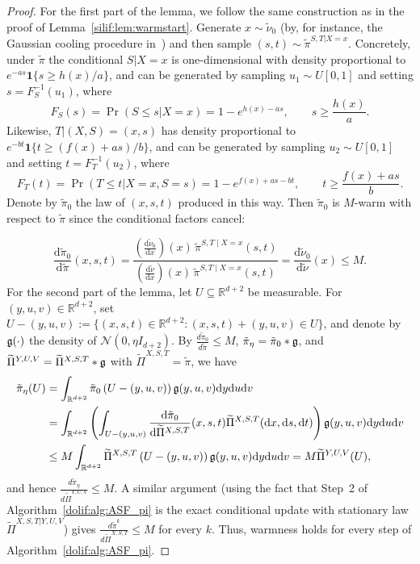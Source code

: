 \documentclass[11pt,letterpaper]{article}
\newcommand{\R}{\mathbb{R}}
\newcommand{\D}{\mathrm{d}}
\newcommand{\brac}[1]{\left( #1\right)}
\begin{document}
\begin{proof}  
For the first part of the lemma, we follow the same construction as in the proof of Lemma~\ref{silif:lem:warmstart}.
Generate $x\sim \tilde{\nu}_0$ (by, for instance, the Gaussian cooling procedure in~\cite[Section 3]{kook2025algodiffusion}) and then sample $(s,t)\sim \tilde{\pi}^{S,T |  X=x}$.
Concretely, under $\tilde{\pi}$ the conditional $S |  X=x$ is one-dimensional with density proportional to $e^{-as}\mathbf{1}\{s\ge h(x)/a\}$, and can be generated by sampling $u_1\sim U[0,1]$ and setting $s=F_S^{-1}(u_1)$, where
\[
F_S(s)=\Pr(S\le s |  X=x)=1-e^{h(x)-as},\qquad s\ge \frac{h(x)}{a}.
\]
Likewise, $T |  (X,S)=(x,s)$ has density proportional to $e^{-bt}\mathbf{1}\{t\ge (f(x)+as)/b\}$, and can be generated by sampling $u_2\sim U[0,1]$ and setting $t=F_T^{-1}(u_2)$, where
\[
F_T(t)=\Pr(T\le t |  X=x,S=s)=1-e^{f(x)+as-bt},\qquad t\ge \frac{f(x)+as}{b}.
\]
Denote by $\tilde{\pi}_0$ the law of $(x,s,t)$ produced in this way. Then $\tilde{\pi}_0$ is $M$-warm with respect to $\tilde{\pi}$ since the conditional factors cancel:

\[
\frac{\D\tilde{\pi}_0}{\D\tilde{\pi}}(x,s,t)=
\frac{\left(\frac{\D\tilde{\nu}_0}{\D x}\right)(x)\,\tilde{\pi}^{S,T \mid X=x}(s,t)}
{\left(\frac{\D \tilde{\nu}}{\D x}\right)(x)\,\tilde{\pi}^{S,T \mid X=x}(s,t)}
=
\frac{\D \tilde{\nu}_0}{\D \tilde{\nu}}(x)
\le M .\]
For the second part of the lemma, let $U\subseteq \R^{d+2}$ be measurable. For $(y,u,v)\in \R^{d+2}$, set
$U-(y,u,v):=\{(x,s,t)\in \R^{d+2}:(x,s,t)+(y,u,v)\in U \}$, and denote by $\frak{g}(\cdot)$ the density of
$\mathcal{N}(0,\eta I_{d+2})$.
By $\frac{d\tilde{\pi}_0}{d\tilde{\pi}}\le M$, $\tilde{\pi}_\eta=\tilde{\pi}_0*\frak{g}$, and
$\widetilde{\Pi}^{Y,U,V}=\widetilde{\Pi}^{X,S,T}*\frak{g}$ with $\widetilde{\Pi}^{X,S,T}=\tilde{\pi}$, we have
\begin{align*}
\tilde{\pi}_\eta(U)
&=\int_{\R^{d+2}} \tilde{\pi}_0\left(U-(y,u,v)\right) \frak{g}(y,u,v)  \D y \D u \D v\\
&=\int_{\R^{d+2}}\brac{\int_{U-(y,u,v)} \frac{\D\tilde{\pi}_0}{\D\widetilde{\Pi}^{X,S,T}}(x,s,t) \widetilde{\Pi}^{X,S,T}(\D x,\D s,\D t) }
\frak{g}(y,u,v)  \D y \D u \D v\\
&\le M\int_{\R^{d+2}} \widetilde{\Pi}^{X,S,T}\left(U-(y,u,v)\right) \frak{g}(y,u,v)  \D y \D u \D v
= M \widetilde{\Pi}^{Y,U,V}(U),
\end{align*}
and hence $\frac{d\tilde{\pi}_\eta}{d\widetilde{\Pi}^{Y,U,V}}\le M$.
A similar argument (using the fact that Step~2 of Algorithm~\ref{dolif:alg:ASF_pi} is the exact conditional update with stationary
law $\widetilde{\Pi}^{X,S,T |  Y,U,V}$) gives $\frac{d\tilde{\pi}^k}{d\widetilde{\Pi}^{X,S,T}}\le M$ for every $k$.
Thus, warmness holds for every step of Algorithm~\ref{dolif:alg:ASF_pi}.
\end{proof}
\end{document}
